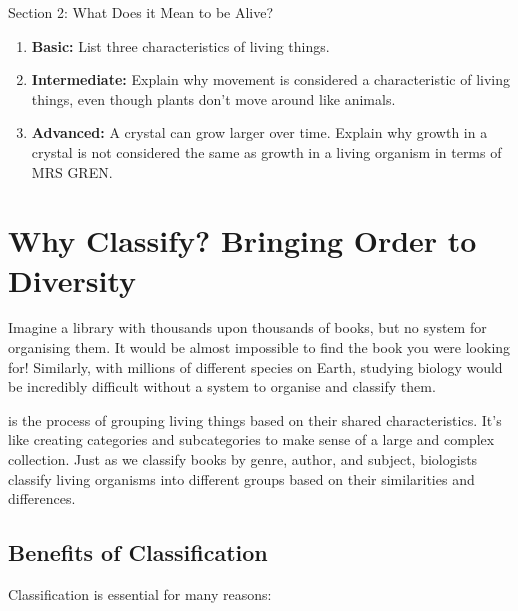 \begin{tieredquestions}{Section 2: What Does it Mean to be Alive?}
\begin{enumerate}
    \item \textbf{Basic:} List three characteristics of living things.
    \item \textbf{Intermediate:} Explain why movement is considered a characteristic of living things, even though plants don't move around like animals.
    \item \textbf{Advanced:}  A crystal can grow larger over time.  Explain why growth in a crystal is not considered the same as growth in a living organism in terms of MRS GREN.
\end{enumerate}
\end{tieredquestions}


\section{Why Classify? Bringing Order to Diversity}

Imagine a library with thousands upon thousands of books, but no system for organising them.  It would be almost impossible to find the book you were looking for!  Similarly, with millions of different species on Earth, studying biology would be incredibly difficult without a system to organise and classify them.

 is the process of grouping living things based on their shared characteristics. It's like creating categories and subcategories to make sense of a large and complex collection.  Just as we classify books by genre, author, and subject, biologists classify living organisms into different groups based on their similarities and differences.

\subsection{Benefits of Classification}

Classification is essential for many reasons:

